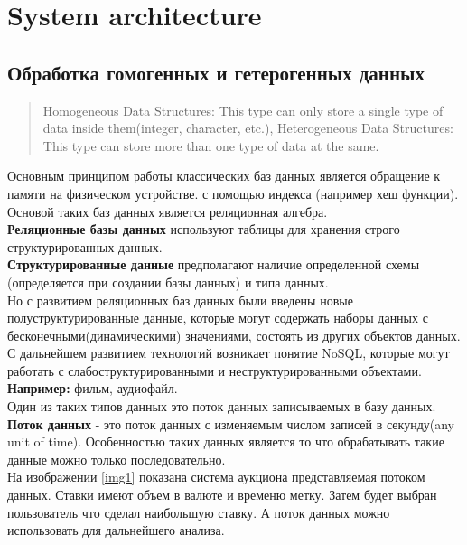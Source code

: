 \documentclass{article}
\begin{document}
%
\tableofcontents
\newpage

\section{System architecture}

\subsection{Обработка гомогенных и гетерогенных данных}
\begin{quote}
    Homogeneous Data Structures: This type can only store a single type of data inside them(integer, character, etc.), Heterogeneous Data Structures: This type can store more than one type of data at the same.
\end{quote}

Основным принципом работы классических баз данных является обращение к памяти на физическом устройстве.
с помощью индекса (например хеш функции). Основой таких баз данных является реляционная алгебра.\\
\textbf{Реляционные базы данных} используют таблицы для хранения строго структурированных данных.\\
\textbf{Структурированные данные} предполагают наличие определенной схемы (определяется при создании базы данных) и типа данных.\\

Но с развитием реляционных баз данных были введены новые полуструктурированные данные, которые могут содержать наборы данных с бесконечными(динамическими) значениями, состоять из других объектов данных. С дальнейшем
развитием технологий возникает понятие NoSQL, которые могут работать с слабоструктурированными и неструктурированными объектами. \textbf{Например: } фильм, аудиофайл.\\
Один из таких типов данных это поток данных записываемых в базу данных.\\
\textbf{Поток данных} - это поток данных с изменяемым числом записей в секунду(any unit of time). Особенностью таких данных является то что обрабатывать такие данные можно только последовательно.\\

На изображении \ref{img1} показана система аукциона представляемая потоком данных. Ставки имеют объем в валюте и временю метку. Затем будет выбран пользователь что сделал наибольшую ставку. А поток данных можно использовать для дальнейшего анализа.
\newpage
\end{document}
